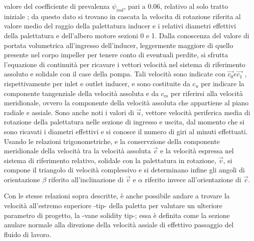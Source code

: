 valore del coefficiente di prevalenza $\psi_{ind}$, pari a $0.06$, relativo al solo tratto iniziale \cite{AIAA_book_1}; da questo dato si trovano in cascata la velocita di rotazione riferita al valore medio del raggio della palettatura inducer e i relativi diametri effettivi della palettatura e dell'albero motore sezioni 0 e 1. Dalla conoscenza del valore di portata volumetrica all'ingresso dell'inducer, leggermente maggiore di quello presente nel corpo impeller per tenere conto di eventuali perdite, si sfrutta l'equazione di continuità per ricavare i vettori velocità nel sistema di riferimento assoluto e solidale con il case della pompa. Tali velocità sono indicate con $\overrightarrow{c_0} e \overrightarrow{c_1}$ , rispettivamente per inlet e outlet inducer, e sono costituite da $c_u$ per indicare la componente tangenziale della velocità assoluta e da $c_m$ per riferirsi alla velocità meridionale, ovvero la componente della velocità assoluta che appartiene al piano radiale e assiale. Sono anche noti i valori di $\overrightarrow{u}$, vettore velocità periferica media di rotazione della palettatura nelle sezione di ingresso e uscita, dal momento che si sono ricavati i diametri effettivi e si conosce il numero di giri al minuti effettuati. Usando le relazioni trigonometriche, e la conservzione della componente meridionale della velocità tra la velocità assoluta $\overrightarrow{c}$ e la velocità espressa nel sistema di riferimento relativo, solidale con la palettatura in rotazione, $\overrightarrow{v}$, si compone il triangolo di velocità complessivo e si determinano infine gli angoli di orientazione $\beta$ riferito all'inclinazione di  $\overrightarrow{v}$ e $\alpha$ riferito invece all'orientazione di $\overrightarrow{c}$.

Con le stesse relazioni sopra descritte, è anche possibile andare a trovare la velocità all'estremo superiore -tip- della paletta per valutare un ulteriore parametro di progetto, la -vane solidity tip-; essa è definita come la sezione anulare normale alla direzione della velocità assiale di effettivo passaggio del fluido di lavoro.
\\

